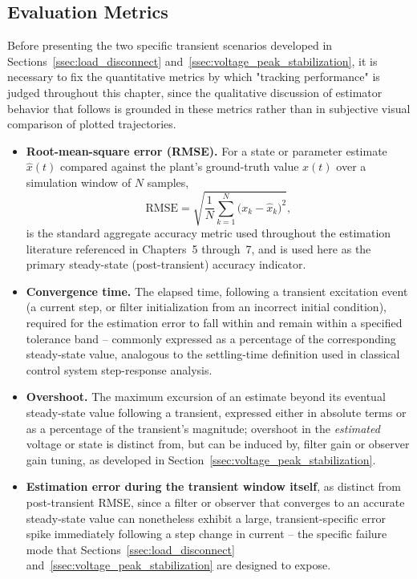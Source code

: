 \subsection{Evaluation Metrics}
\label{ssec:transient_metrics}

Before presenting the two specific transient scenarios developed in Sections~\ref{ssec:load_disconnect} and~\ref{ssec:voltage_peak_stabilization}, it is necessary to fix the quantitative metrics by which "tracking performance" is judged throughout this chapter, since the qualitative discussion of estimator behavior that follows is grounded in these metrics rather than in subjective visual comparison of plotted trajectories.

\begin{itemize}
	\item \textbf{Root-mean-square error (RMSE).} For a state or parameter estimate $\hat{x}(t)$ compared against the plant's ground-truth value $x(t)$ over a simulation window of $N$ samples,
	\begin{equation}
		\mathrm{RMSE} = \sqrt{\frac{1}{N}\sum_{k=1}^{N} \big(x_k - \hat{x}_k\big)^2},
		\label{eq:rmse}
	\end{equation}
	is the standard aggregate accuracy metric used throughout the estimation literature referenced in Chapters~5 through~7, and is used here as the primary steady-state (post-transient) accuracy indicator.
	\item \textbf{Convergence time.} The elapsed time, following a transient excitation event (a current step, or filter initialization from an incorrect initial condition), required for the estimation error to fall within and remain within a specified tolerance band -- commonly expressed as a percentage of the corresponding steady-state value, analogous to the settling-time definition used in classical control system step-response analysis.
	\item \textbf{Overshoot.} The maximum excursion of an estimate beyond its eventual steady-state value following a transient, expressed either in absolute terms or as a percentage of the transient's magnitude; overshoot in the \emph{estimated} voltage or state is distinct from, but can be induced by, filter gain or observer gain tuning, as developed in Section~\ref{ssec:voltage_peak_stabilization}.
	\item \textbf{Estimation error during the transient window itself}, as distinct from post-transient RMSE, since a filter or observer that converges to an accurate steady-state value can nonetheless exhibit a large, transient-specific error spike immediately following a step change in current -- the specific failure mode that Sections~\ref{ssec:load_disconnect} and~\ref{ssec:voltage_peak_stabilization} are designed to expose.
\end{itemize}

